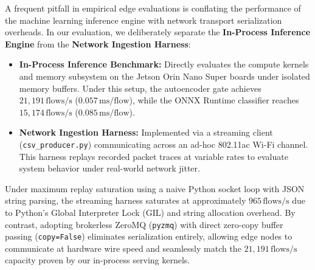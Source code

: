 A frequent pitfall in empirical edge evaluations is conflating the performance of the machine learning inference engine with network transport serialization overheads. In our evaluation, we deliberately separate the \textbf{In-Process Inference Engine} from the \textbf{Network Ingestion Harness}:
\begin{itemize}
    \item \textbf{In-Process Inference Benchmark:} Directly evaluates the compute kernels and memory subsystem on the Jetson Orin Nano Super boards under isolated memory buffers. Under this setup, the autoencoder gate achieves $21{,}191\,\text{flows/s}$ ($0.057\,\text{ms/flow}$), while the ONNX Runtime classifier reaches $15{,}174\,\text{flows/s}$ ($0.085\,\text{ms/flow}$).
    \item \textbf{Network Ingestion Harness:} Implemented via a streaming client (\texttt{csv\_producer.py}) communicating across an ad-hoc 802.11ac Wi-Fi channel. This harness replays recorded packet traces at variable rates to evaluate system behavior under real-world network jitter.
\end{itemize}

Under maximum replay saturation using a naive Python socket loop with JSON string parsing, the streaming harness saturates at approximately $965\,\text{flows/s}$ due to Python's Global Interpreter Lock (GIL) and string allocation overhead. By contrast, adopting brokerless ZeroMQ (\texttt{pyzmq}) with direct zero-copy buffer passing (\texttt{copy=False}) eliminates serialization entirely, allowing edge nodes to communicate at hardware wire speed and seamlessly match the $21{,}191\,\text{flows/s}$ capacity proven by our in-process serving kernels.
